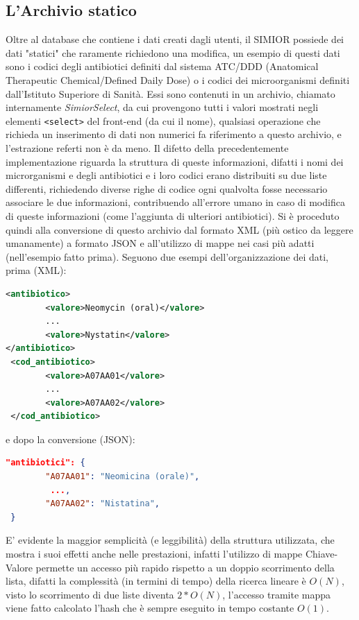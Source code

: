 \subsection{L'Archivio statico}
Oltre al database che contiene i dati creati dagli utenti, il SIMIOR possiede dei dati "statici" che raramente richiedono una modifica, un esempio di questi dati sono i codici degli antibiotici definiti dal sistema ATC/DDD (Anatomical Therapeutic Chemical/Defined Daily Dose) o i codici dei microorganismi definiti dall'Istituto Superiore di Sanità.
Essi sono contenuti in un archivio, chiamato internamente \textit{SimiorSelect}, da cui provengono tutti i valori mostrati negli elementi \texttt{<select>} del front-end (da cui il nome), qualsiasi operazione che richieda un inserimento di dati non numerici fa riferimento a questo archivio, e l'estrazione referti non è da meno. Il difetto della precedentemente implementazione riguarda la struttura di queste informazioni, difatti i nomi dei microrganismi e degli antibiotici e i loro codici erano distribuiti su due liste differenti, richiedendo diverse righe di codice ogni qualvolta fosse necessario associare le due informazioni, contribuendo all'errore umano in caso di modifica di queste informazioni (come l'aggiunta di ulteriori antibiotici).
Si è proceduto quindi alla conversione di questo archivio dal formato XML (più ostico da leggere umanamente) a formato JSON e all'utilizzo di mappe nei casi più adatti (nell'esempio fatto prima). Seguono due esempi dell'organizzazione dei dati, prima (XML):
\begin{lstlisting}[language=xml]
<antibiotico>
        <valore>Neomycin (oral)</valore>
        ...
        <valore>Nystatin</valore>
</antibiotico>
 <cod_antibiotico>
        <valore>A07AA01</valore>
        ...
        <valore>A07AA02</valore>
 </cod_antibiotico>
\end{lstlisting}
e dopo la conversione (JSON):
\begin{lstlisting}[language=json]
  "antibiotici": {
        "A07AA01": "Neomicina (orale)",
         ...,
        "A07AA02": "Nistatina",
 }
\end{lstlisting}
E' evidente la maggior semplicità (e leggibilità) della struttura utilizzata, che mostra i suoi effetti anche nelle prestazioni, infatti l'utilizzo di mappe Chiave-Valore permette un accesso più rapido rispetto a un doppio scorrimento della lista, difatti la complessità (in termini di tempo) della ricerca lineare è $O(N)$, visto lo scorrimento di due liste diventa $2*O(N)$, l'accesso tramite mappa viene fatto calcolato l'hash che è sempre eseguito in tempo costante $O(1)$.
